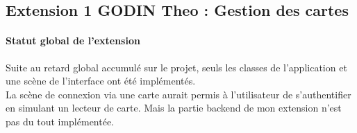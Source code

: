\documentclass[../rapport.tex]{subfiles}
\begin{document}
			\newpage

	\subsection{Extension 1 GODIN Theo : Gestion des cartes}
		
		\paragraph{Statut global de l'extension}
		Suite au retard global accumulé sur le projet, seuls les classes de l'application et une scène de l'interface ont été implémentés.\\
		La scène de connexion via une carte aurait permis à l'utilisateur de s'authentifier en simulant un lecteur de carte. Mais la partie backend de mon extension n'est pas du tout implémentée. 
\end{document}
